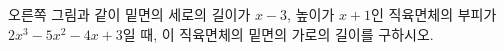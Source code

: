 \noindent\begin{minipage}[t]{0.58\linewidth}\vspace{0pt}\raggedright 오른쪽 그림과 같이 밑면의 세로의 길이가 $x-3$, 높이가 $x+1$인 직육면체의 부피가 $2x^3-5x^2-4x+3$일 때, 이 직육면체의 밑면의 가로의 길이를 구하시오.\end{minipage}\hfill\begin{minipage}[t]{0.4\linewidth}\vspace{0pt}\centering \resizebox{\ifdim\width>\linewidth\linewidth\else\width\fi}{!}{}\end{minipage}\par
